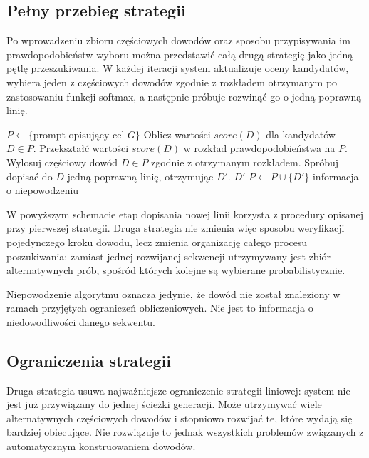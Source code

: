\documentclass[shortabstract]{iithesis}
\theoremstyle{definition}
\theoremstyle{remark}
\theoremstyle{plain}
\begin{document}
\subsection{Pełny przebieg strategii}

Po wprowadzeniu zbioru częściowych dowodów oraz sposobu przypisywania im
prawdopodobieństw wyboru można przedstawić całą drugą strategię jako jedną pętlę
przeszukiwania. W każdej iteracji system aktualizuje oceny kandydatów, wybiera jeden
z częściowych dowodów zgodnie z rozkładem otrzymanym po zastosowaniu funkcji
softmax, a następnie próbuje rozwinąć go o jedną poprawną linię.

\begin{algorithm}[H]
\caption{Przeszukiwanie wielu częściowych dowodów}
\begin{algorithmic}[1]
\State \(P \gets \{\text{prompt opisujący cel } G\}\)
    \State Oblicz wartości \(score(D)\) dla kandydatów \(D \in P\).
    \State Przekształć wartości \(score(D)\) w rozkład prawdopodobieństwa na \(P\).
    \State Wylosuj częściowy dowód \(D \in P\) zgodnie z otrzymanym rozkładem.
    \State Spróbuj dopisać do \(D\) jedną poprawną linię, otrzymując \(D'\).
        \State \Return \(D'\)
        \State \(P \gets P \cup \{D'\}\)
    \EndIf
\EndWhile
\State \Return informacja o niepowodzeniu
\end{algorithmic}
\end{algorithm}

W powyższym schemacie etap dopisania nowej linii korzysta z procedury opisanej
przy pierwszej strategii. Druga strategia nie zmienia więc sposobu weryfikacji
pojedynczego kroku dowodu, lecz zmienia organizację całego procesu poszukiwania:
zamiast jednej rozwijanej sekwencji utrzymywany jest zbiór alternatywnych prób,
spośród których kolejne są wybierane probabilistycznie.

Niepowodzenie algorytmu oznacza jedynie, że dowód nie został znaleziony w ramach
przyjętych ograniczeń obliczeniowych. Nie jest to informacja o niedowodliwości
danego sekwentu.

\subsection{Ograniczenia strategii}

Druga strategia usuwa najważniejsze ograniczenie strategii liniowej: system nie jest
już przywiązany do jednej ścieżki generacji. Może utrzymywać wiele alternatywnych
częściowych dowodów i stopniowo rozwijać te, które wydają się bardziej obiecujące.
Nie rozwiązuje to jednak wszystkich problemów związanych z automatycznym
konstruowaniem dowodów.
\end{document}
